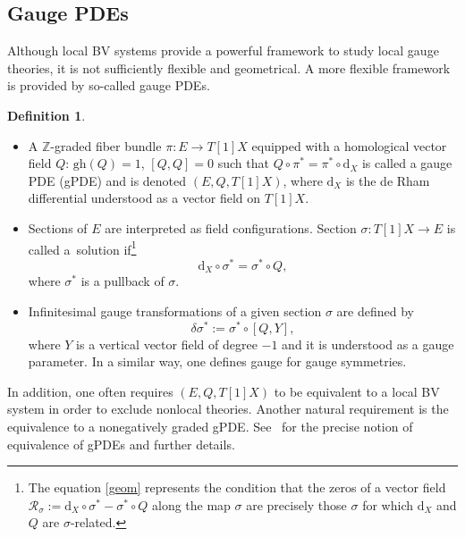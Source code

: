 \documentclass[pdftex]{sigma}
\numberwithin{equation}{section}
\theoremstyle{definition}
\newtheorem{Definition}[Theorem]{Definition}
\newcommand{\gh}[1]{\mathrm{gh}(#1)}
\newcommand{\dx}{\mathrm{d}_X}
\begin{document}
\subsection{Gauge PDEs}
Although local BV systems provide a powerful framework to study local gauge theories, it is not sufficiently flexible and geometrical. A more flexible framework is provided by so-called gauge PDEs.

\begin{Definition}\quad
\begin{itemize}\itemsep=0pt
 \item A $\mathbb{Z}$-graded fiber bundle $\pi\colon E \rightarrow T[1]X$ equipped with a homological vector field $Q$: $\gh{Q} =1$, $[Q,Q]=0$ such that $Q\circ\pi^* = \pi^*\circ \dx$ is called a gauge PDE (gPDE) and is denoted $(E,Q,T[1]X)$, where $\dx$ is the de Rham differential understood as a vector field on $T[1]X$.
 \item Sections of $E$ are interpreted as field configurations. Section $\sigma\colon T[1]X\rightarrow E$ is called a~solution if\footnote{The equation \eqref{geom} represents the condition that the zeros of a vector field $\mathcal{R}_\sigma:=\dx\circ \sigma^* - \sigma^* \circ Q$ along the map $\sigma$ are precisely those $\sigma$ for which $\dx$ and $Q$ are $\sigma$-related.}
 \begin{equation}\label{geom}
 \dx\circ \sigma^*=\sigma^*\circ Q,
 \end{equation}
 where $\sigma^*$ is a pullback of $\sigma$.
 \item Infinitesimal gauge transformations of a given section $\sigma$ are defined by
 \begin{equation}\label{gt}
 \delta\sigma^*:=\sigma^*\circ [Q,Y],
 \end{equation}
 where $Y$ is a vertical vector field of degree $-1$ and it is understood as a gauge parameter. In a similar way, one defines gauge for gauge symmetries.
\end{itemize}
\end{Definition}
In addition, one often requires $(E,Q,T[1]X)$ to be equivalent to a local BV system in order to exclude nonlocal theories. Another natural requirement is the equivalence to a nonegatively graded gPDE. See~\cite{Grigoriev:2019ojp} for the precise notion of equivalence of gPDEs and further details.
\end{document}

